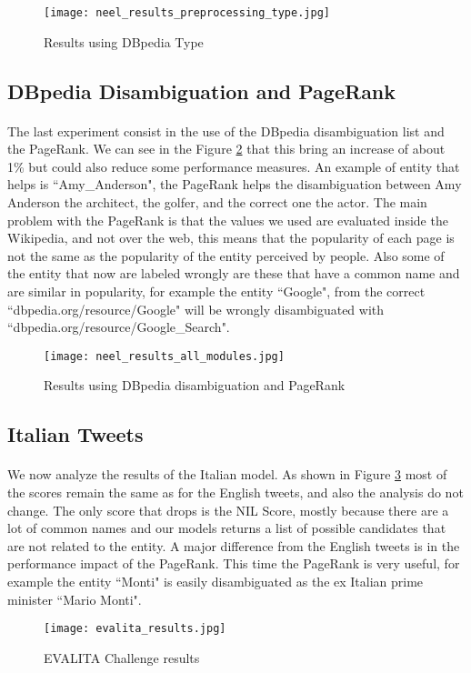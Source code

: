 \vspace{-5pt}
\begin{figure}[ht]
\texttt{[image: neel\_results\_preprocessing\_type.jpg]}
\caption{Results using DBpedia Type}
\label{fig:dbpedia_type}
\end{figure}
\vspace{-20pt}

\subsection{DBpedia Disambiguation and PageRank}
\paragraph{}
The last experiment consist in the use of the DBpedia disambiguation list and the PageRank. We can see in the Figure \ref{fig:all_modules} that this bring an increase of about 1\% but could also reduce some performance measures.  An example of entity that helps is ``Amy\_Anderson", the PageRank helps the disambiguation between Amy Anderson the architect, the golfer, and the correct one the actor. The main problem with the PageRank is that the values we used are evaluated inside the Wikipedia, and not over the web, this means that the popularity of each page is not the same as the popularity of the entity perceived by people. Also some of the entity that now are labeled wrongly are these that have a common name and are similar in popularity, for example the entity ``Google", from the correct ``dbpedia.org/resource/Google" will be wrongly disambiguated with ``dbpedia.org/resource/Google\_Search".


\vspace{-5pt}
\begin{figure}[ht]
\texttt{[image: neel\_results\_all\_modules.jpg]}
\caption{Results using DBpedia disambiguation and PageRank}
\label{fig:all_modules}
\end{figure}
\vspace{-25pt}

\subsection{Italian Tweets}
\paragraph{}
We now analyze the results of the Italian model. As shown in Figure \ref{fig:evalita_results} most of the scores remain the same as for the English tweets, and also the analysis do not change. The only score that drops is the NIL Score, mostly because there are a lot of common names and our models returns a list of possible candidates that are not related to the entity. A major difference from the English tweets is in the performance impact of the PageRank. This time the PageRank is very useful, for example the entity ``Monti" is easily disambiguated as the ex Italian prime minister ``Mario Monti". 


\vspace{-10pt}
\begin{figure}[ht]
\texttt{[image: evalita\_results.jpg]}
\caption{EVALITA Challenge results}
\label{fig:evalita_results}
\end{figure}


